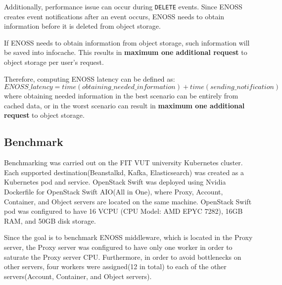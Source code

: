     Additionally, performance issue can occur during \texttt{DELETE} events. Since ENOSS creates event notifications after an event occurs, ENOSS needs to obtain information before it is deleted from object storage.

    If ENOSS needs to obtain information from object storage, such information will be saved into infocache. This results in \textbf{maximum one additional request} to object storage per user's request.

    Therefore, computing ENOSS latency can be defined as:
    \texttt{\[ENOSS\_latency = time(obtaining\_needed\_information) + time(sending\_notification)\]}
    where obtaining needed information in the best scenario can be entirely from cached data, or in the worst scenario can result in \textbf{maximum one additional request} to object storage.

    \subsection{Benchmark}
    Benchmarking was carried out on the FIT VUT university Kubernetes cluster. Each supported destination(Beanstalkd, Kafka, Elasticsearch) was created as a Kubernetes pod and service. OpenStack Swift was deployed using Nvidia Dockerfile for OpenStack Swift AIO(All in One), where Proxy, Account, Container, and Object servers are located on the same machine. OpenStack Swift pod was configured to have 16 VCPU (CPU Model: AMD EPYC 7282), 16GB RAM, and 50GB disk storage.

    Since the goal is to benchmark ENOSS middleware, which is located in the Proxy server, the Proxy server was configured to have only one worker in order to saturate the Proxy server CPU. Furthermore, in order to avoid bottlenecks on other servers, four workers were assigned(12 in total) to each of the other servers(Account, Container, and Object servers).

